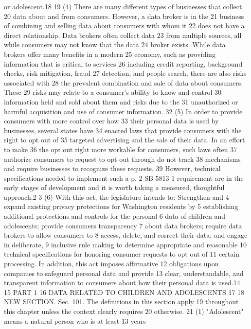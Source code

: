 or adolescent.18
19 (4) There are many different types of businesses that collect
20 data about and from consumers. However, a data broker is in the
21 business of combining and selling data about consumers with whom it
22 does not have a direct relationship. Data brokers often collect data
23 from multiple sources, all while consumers may not know that the data
24 broker exists. While data brokers offer many benefits in a modern
25 economy, such as providing information that is critical to services
26 including credit reporting, background checks, risk mitigation, fraud
27 detection, and people search, there are also risks associated with
28 the prevalent combination and sale of data about consumers. These
29 risks may relate to a consumer's ability to know and control
30 information held and sold about them and risks due to the
31 unauthorized or harmful acquisition and use of consumer information.
32 (5) In order to provide consumers with more control over how
33 their personal data is used by businesses, several states have
34 enacted laws that provide consumers with the right to opt out of
35 targeted advertising and the sale of their data. In an effort to make
36 the opt out right more workable for consumers, such laws often
37 authorize consumers to request to opt out through do not track
38 mechanisms and require businesses to recognize these requests.
39 However, technical specifications needed to implement such a
p. 2 SB 5813
1 requirement are in the early stages of development and it is worth
taking a measured, thoughtful approach.2
3 (6) With this act, the legislature intends to: Strengthen and
4 expand existing privacy protections for Washington residents by
5 establishing additional protections and controls for the personal
6 data of children and adolescents; provide consumers transparency
7 about data brokers; require data brokers to allow consumers to
8 access, delete, and correct their data; and engage in deliberate,
9 inclusive rule making to determine appropriate and reasonable
10 technical specifications for honoring consumer requests to opt out of
11 certain processing. In addition, this act imposes affirmative
12 obligations upon companies to safeguard personal data and provide
13 clear, understandable, and transparent information to consumers about
how their personal data is used.14
15 PART 1
16 DATA RELATED TO CHILDREN AND ADOLESCENTS
17
18 NEW SECTION. Sec. 101. The definitions in this section apply
19 throughout this chapter unless the context clearly requires
20 otherwise.
21 (1) "Adolescent" means a natural person who is at least 13 years

